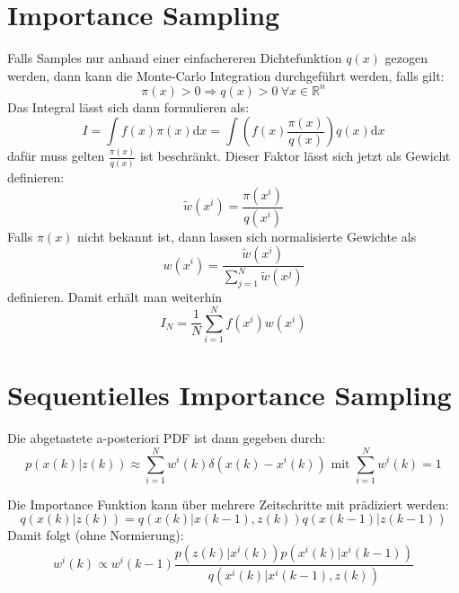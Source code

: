 \section{Importance Sampling}
Falls Samples nur anhand einer einfachereren Dichtefunktion $q(x)$ gezogen werden,
dann kann die Monte-Carlo Integration durchgeführt werden, falls gilt:
\begin{equation*}
    \pi(x) > 0 \Rightarrow q(x) > 0\ \forall x \in \mathbb{R}^n
\end{equation*}
Das Integral lässt sich dann formulieren als:
\begin{equation*}
    I = \int f(x) \pi(x) \text{d}x = \int \left( f(x) \frac{\pi(x)}{q(x)} \right) q(x) \text{d}x
\end{equation*}
dafür muss gelten $\frac{\pi(x)}{q(x)}$ ist beschränkt. Dieser Faktor lässt sich jetzt als Gewicht definieren:
\begin{equation*}
    \tilde{w}(x^i) = \frac{\pi(x^i)}{q(x^i)}
\end{equation*}
Falls $\pi(x)$ nicht bekannt ist, dann lassen sich normalisierte Gewichte als
\begin{equation*}
    w(x^i) = \frac{\tilde{w}(x^i)}{\sum_{j=1}^N \tilde{w}(x^j)}
\end{equation*}
definieren. Damit erhält man weiterhin
\begin{equation*}
    I_N = \frac{1}{N} \sum_{i=1}^N f(x^i) w(x^i)
\end{equation*}

\section{Sequentielles Importance Sampling}
Die \glqq{}abgetastete\grqq{} a-posteriori PDF ist dann gegeben durch:
\begin{equation*}
    p(x(k)|z(k)) \approx \sum_{i=1}^N w^i (k) \delta(x(k) - x^i(k))
        \text{ mit } \sum_{i=1}^N w^i(k) = 1
\end{equation*}

Die Importance Funktion kann über mehrere Zeitschritte mit prädiziert werden:
\begin{equation*}
    q(x(k)|z(k)) =  q(x(k)|x(k-1),z(k)) q(x(k-1)|z(k-1))
\end{equation*}
Damit folgt (ohne Normierung):
\begin{equation*}
    w^i(k) \propto w^i(k-1) \frac{p(z(k) | x^i(k)) p(x^i(k) | x^i(k-1))}{q(x^i(k) | x^i(k-1), z(k))}
\end{equation*}

